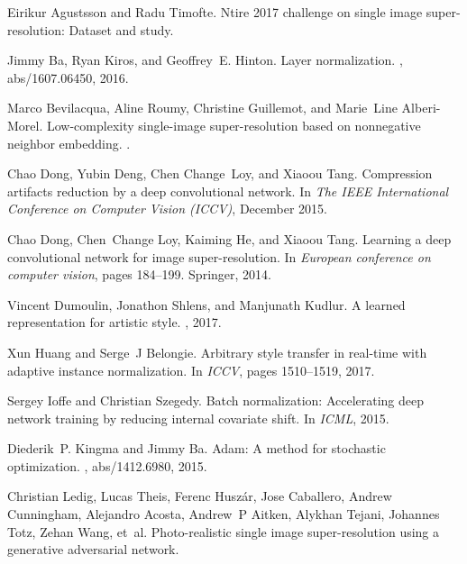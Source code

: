 \documentclass[10pt,twocolumn,letterpaper]{article}
\begin{document}
{\small

\begin{thebibliography}{10}\itemsep=-1pt
	
	Eirikur Agustsson and Radu Timofte.
	\newblock Ntire 2017 challenge on single image super-resolution: Dataset and
	study.
	
	Jimmy Ba, Ryan Kiros, and Geoffrey~E. Hinton.
	\newblock Layer normalization.
	, abs/1607.06450, 2016.
	
	Marco Bevilacqua, Aline Roumy, Christine Guillemot, and Marie~Line
	Alberi-Morel.
	\newblock Low-complexity single-image super-resolution based on nonnegative
	neighbor embedding.
	.
	
	Chao Dong, Yubin Deng, Chen Change~Loy, and Xiaoou Tang.
	\newblock Compression artifacts reduction by a deep convolutional network.
	\newblock In {\em The IEEE International Conference on Computer Vision (ICCV)},
	December 2015.
	
	Chao Dong, Chen~Change Loy, Kaiming He, and Xiaoou Tang.
	\newblock Learning a deep convolutional network for image super-resolution.
	\newblock In {\em European conference on computer vision}, pages 184--199.
	Springer, 2014.
	
	Vincent Dumoulin, Jonathon Shlens, and Manjunath Kudlur.
	\newblock A learned representation for artistic style.
	, 2017.
	
	Xun Huang and Serge~J Belongie.
	\newblock Arbitrary style transfer in real-time with adaptive instance
	normalization.
	\newblock In {\em ICCV}, pages 1510--1519, 2017.
	
	Sergey Ioffe and Christian Szegedy.
	\newblock Batch normalization: Accelerating deep network training by reducing
	internal covariate shift.
	\newblock In {\em ICML}, 2015.
	
	Diederik~P. Kingma and Jimmy Ba.
	\newblock Adam: A method for stochastic optimization.
	, abs/1412.6980, 2015.
	
	Christian Ledig, Lucas Theis, Ferenc Husz{\'a}r, Jose Caballero, Andrew
	Cunningham, Alejandro Acosta, Andrew~P Aitken, Alykhan Tejani, Johannes Totz,
	Zehan Wang, et~al.
	\newblock Photo-realistic single image super-resolution using a generative
	adversarial network.
	

\end{thebibliography}}
\end{document}
